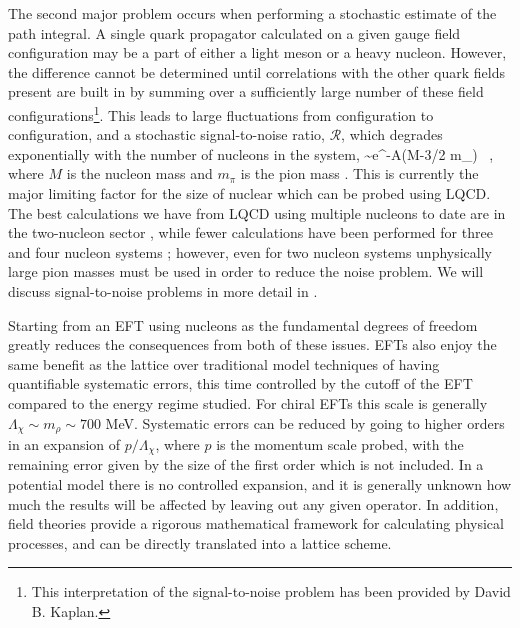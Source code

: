 The second major problem occurs when performing a stochastic estimate of the path integral. A single quark propagator calculated on a given gauge field configuration may be a part of either a light meson or a heavy nucleon. However, the difference cannot be determined until correlations with the other quark fields present are built in by summing over a sufficiently large number of these field configurations\footnote{This interpretation of the signal-to-noise problem has been provided by David B. Kaplan.}. This leads to large fluctuations from configuration to configuration, and a stochastic signal-to-noise ratio, ${\mathcal{ R}}$, which degrades exponentially with the number of nucleons in the system,
\beq
{} \sim e^{-A(M-3/2 m_{\pi})\tau} \ ,
\eeq
where $M$ is the nucleon mass and $m_{\pi}$ is the pion mass \cite{Lepage:1989hd}. This is currently the major limiting factor for the size of nuclear which can be probed using LQCD. The best calculations we have from LQCD using multiple nucleons to date are in the two-nucleon sector \cite{Berkowitz:2015eaa,Kurth:2015cvl,Nicholson:2015pys,Orginos:2015aya,Detmold:2015daa,Chang:2015qxa,Beane:2015yha,Beane:2014sda,Beane:2014ora,Beane:2013br,Beane:2012vq,Beane:2011iw,Beane:2009py,Yamazaki:2015vjn,Yamazaki:2015asa,Yamazaki:2013rna,Yamazaki:2012fn,Yamazaki:2012hi,Doi:2015uvd,Doi:2015oha,Ishii:2006ec,Murano:2013xxa,Aoki:2014mia,Murano:2013gta,HALQCD:2012aa,Inoue:2010hs}, while fewer calculations have been performed for three and four nucleon systems \cite{Beane:2009gs,Beane:2012vq,Beane:2014ora,Beane:2014sda,Chang:2015qxa,Yamazaki:2015vjn,Yamazaki:2015asa,Yamazaki:2013rna,Yamazaki:2012fn,Yamazaki:2012hi,Doi:2011gq}; however, even for two nucleon systems unphysically large pion masses must be used in order to reduce the noise problem. We will discuss signal-to-noise problems in more detail in . 

Starting from an EFT using nucleons as the fundamental degrees of freedom greatly reduces the consequences from both of these issues. EFTs also enjoy the same benefit as the lattice over traditional model techniques of having quantifiable systematic errors, this time controlled by the cutoff of the EFT compared to the energy regime studied. For chiral EFTs this scale is generally $\Lambda_{\chi} \sim m_{\rho} \sim 700$ MeV. Systematic errors can be reduced by going to higher orders in an expansion of $p/\Lambda_{\chi}$, where $p$ is the momentum scale probed, with the remaining error given by the size of the first order which is not included. In a potential model there is no controlled expansion, and it is generally unknown how much the results will be affected by leaving out any given operator. In addition, field theories provide a rigorous mathematical framework for calculating physical processes, and can be directly translated into a lattice scheme.

